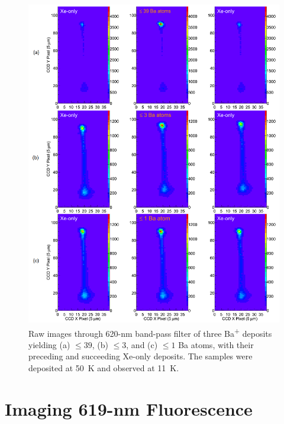 


\begin{figure} %
        \centering
                \includegraphics[width=.95\textwidth]{figures/xebaxe_instantaneous_scrunched.png}
                \caption{Raw images through 620-nm band-pass filter of three Ba\textsuperscript{+} deposits yielding (a) $\leq 39$, (b) $\leq 3$, and (c) $\leq 1$ Ba atoms, with their preceding and succeeding Xe-only deposits.  The samples were deposited at 50~K and observed at 11~K.}
\label{fig:xebaxe}
\end{figure}

\section{Imaging 619-nm Fluorescence}
\label{sec:imaging619}

